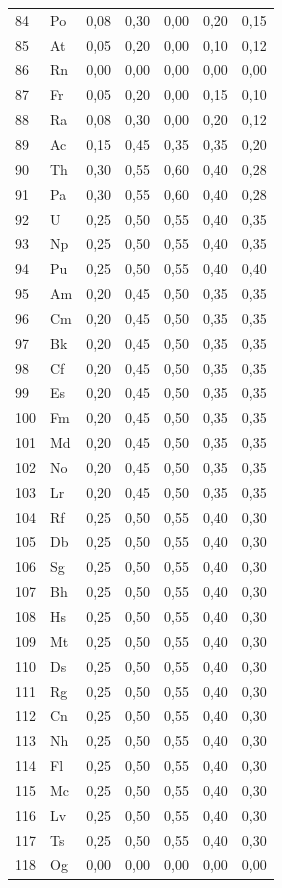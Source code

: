 \documentclass[12pt,a4paper]{article}
\begin{document}
\begin{longtable}{p{2.2cm}p{1.2cm}p{2.2cm}p{2.2cm}p{2.2cm}p{2.2cm}p{2.2cm}}
		84 & Po  & 0,08 & 0,30 & 0,00 & 0,20 & 0,15 \\
		85 & At  & 0,05 & 0,20 & 0,00 & 0,10 & 0,12 \\
		86 & Rn  & 0,00 & 0,00 & 0,00 & 0,00 & 0,00 \\
		87 & Fr  & 0,05 & 0,20 & 0,00 & 0,15 & 0,10 \\
		88 & Ra  & 0,08 & 0,30 & 0,00 & 0,20 & 0,12 \\
		89 & Ac  & 0,15 & 0,45 & 0,35 & 0,35 & 0,20 \\
		90 & Th  & 0,30 & 0,55 & 0,60 & 0,40 & 0,28 \\
		91 & Pa  & 0,30 & 0,55 & 0,60 & 0,40 & 0,28 \\
		92 & U   & 0,25 & 0,50 & 0,55 & 0,40 & 0,35 \\
		93 & Np  & 0,25 & 0,50 & 0,55 & 0,40 & 0,35 \\
		94 & Pu  & 0,25 & 0,50 & 0,55 & 0,40 & 0,40 \\
		95 & Am  & 0,20 & 0,45 & 0,50 & 0,35 & 0,35 \\
		96 & Cm  & 0,20 & 0,45 & 0,50 & 0,35 & 0,35 \\
		97 & Bk  & 0,20 & 0,45 & 0,50 & 0,35 & 0,35 \\
		98 & Cf  & 0,20 & 0,45 & 0,50 & 0,35 & 0,35 \\
		99 & Es  & 0,20 & 0,45 & 0,50 & 0,35 & 0,35 \\
		100& Fm  & 0,20 & 0,45 & 0,50 & 0,35 & 0,35 \\
		101& Md  & 0,20 & 0,45 & 0,50 & 0,35 & 0,35 \\
		102& No  & 0,20 & 0,45 & 0,50 & 0,35 & 0,35 \\
		103& Lr  & 0,20 & 0,45 & 0,50 & 0,35 & 0,35 \\
		104& Rf  & 0,25 & 0,50 & 0,55 & 0,40 & 0,30 \\
		105& Db  & 0,25 & 0,50 & 0,55 & 0,40 & 0,30 \\
		106& Sg  & 0,25 & 0,50 & 0,55 & 0,40 & 0,30 \\
		107& Bh  & 0,25 & 0,50 & 0,55 & 0,40 & 0,30 \\
		108& Hs  & 0,25 & 0,50 & 0,55 & 0,40 & 0,30 \\
		109& Mt  & 0,25 & 0,50 & 0,55 & 0,40 & 0,30 \\
		110& Ds  & 0,25 & 0,50 & 0,55 & 0,40 & 0,30 \\
		111& Rg  & 0,25 & 0,50 & 0,55 & 0,40 & 0,30 \\
		112& Cn  & 0,25 & 0,50 & 0,55 & 0,40 & 0,30 \\
		113& Nh  & 0,25 & 0,50 & 0,55 & 0,40 & 0,30 \\
		114& Fl  & 0,25 & 0,50 & 0,55 & 0,40 & 0,30 \\
		115& Mc  & 0,25 & 0,50 & 0,55 & 0,40 & 0,30 \\
		116& Lv  & 0,25 & 0,50 & 0,55 & 0,40 & 0,30 \\
		117& Ts  & 0,25 & 0,50 & 0,55 & 0,40 & 0,30 \\
		118& Og  & 0,00 & 0,00 & 0,00 & 0,00 & 0,00 \\
		\bottomrule
	\end{longtable}
	
\end{document}
